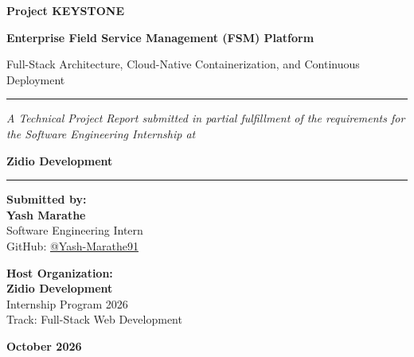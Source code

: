 \documentclass[12pt,a4paper,oneside]{report}
\begin{document}
\begin{titlepage}
    \centering
    \vspace*{0.5cm}
    
    {\Huge\bfseries Project KEYSTONE\par}
    \vspace{0.4cm}
    {\Large\bfseries Enterprise Field Service Management (FSM) Platform\par}
    \vspace{0.2cm}
    {\large Full-Stack Architecture, Cloud-Native Containerization, and Continuous Deployment\par}
    
    \vspace{1.5cm}
    \rule{\linewidth}{1.5pt}\par
    \vspace{0.5cm}
    {\large\itshape A Technical Project Report submitted in partial fulfillment of the requirements for the Software Engineering Internship at\par}
    \vspace{0.5cm}
    {\LARGE\bfseries Zidio Development\par}
    \vspace{0.5cm}
    \rule{\linewidth}{1.5pt}\par
    
    \vspace{2cm}
    
    \begin{minipage}{0.48\textwidth}
        \begin{flushleft} \large
            \textbf{Submitted by:}\\
            \textbf{Yash Marathe}\\
            Software Engineering Intern\\
            GitHub: \href{https://github.com/Yash-Marathe91}{@Yash-Marathe91}
        \end{flushleft}
    \end{minipage}
    \hfill
    \begin{minipage}{0.48\textwidth}
        \begin{flushright} \large
            \textbf{Host Organization:}\\
            \textbf{Zidio Development}\\
            Internship Program 2026\\
            Track: Full-Stack Web Development
        \end{flushright}
    \end{minipage}

    \vfill
    {\large\bfseries October 2026}\par
\end{titlepage}
\end{document}
